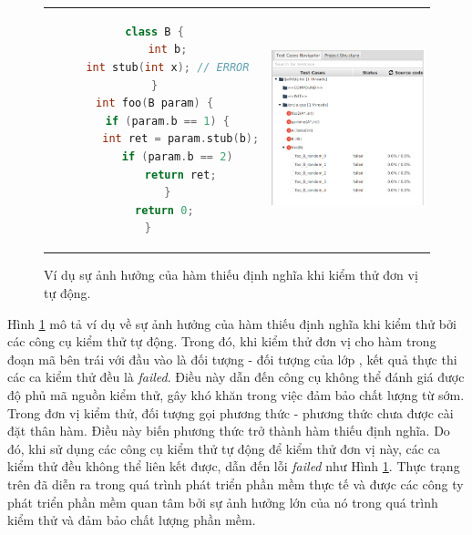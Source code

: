\begin{figure}[h]
	\begin{tabular}{cc}
		\begin{minipage}[b]{0.5\textwidth}
			\begin{lstlisting}[language=C++]
class B {
	int b;
	int stub(int x); // ERROR
}
int foo(B param) {
	if (param.b == 1) {
		int ret = param.stub(b);
		if (param.b == 2) 
		return ret;
	}
	return 0; 
}  
			\end{lstlisting}
		\end{minipage}
		& \begin{minipage}[b]{0.5\textwidth}
			\centering
			\includegraphics[width=\linewidth]{images/effect.png}
		\end{minipage}
	\end{tabular}
	\caption{Ví dụ sự ảnh hưởng của hàm thiếu định nghĩa khi kiểm thử đơn vị tự động.}
	\label{fig:affect}
\end{figure}

Hình \ref{fig:affect} mô tả ví dụ về sự ảnh hưởng của hàm thiếu định nghĩa khi kiểm thử bởi các công cụ kiểm thử tự động. Trong đó, khi kiểm thử đơn vị cho hàm  trong đoạn mã bên trái với đầu vào là đối tượng  - đối tượng của lớp , kết quả thực thi các ca kiểm thử đều là \textit{failed}. Điều này dẫn đến công cụ không thể đánh giá được độ phủ mã nguồn kiểm thử, gây khó khăn trong việc đảm bảo chất lượng từ sớm. Trong đơn vị kiểm thử, đối tượng  gọi phương thức  - phương thức chưa được cài đặt thân hàm. Điều này biến phương thức trở thành hàm thiếu định nghĩa. Do đó, khi sử dụng các công cụ kiểm thử tự động để kiểm thử đơn vị này, các ca kiểm thử đều không thể liên kết được, dẫn đến lỗi \textit{failed} như Hình \ref{fig:affect}. Thực trạng trên đã diễn ra trong quá trình phát triển phần mềm thực tế và được các công ty phát triển phần mềm quan tâm bởi sự ảnh hưởng lớn của nó trong quá trình kiểm thử và đảm bảo chất lượng phần mềm.

